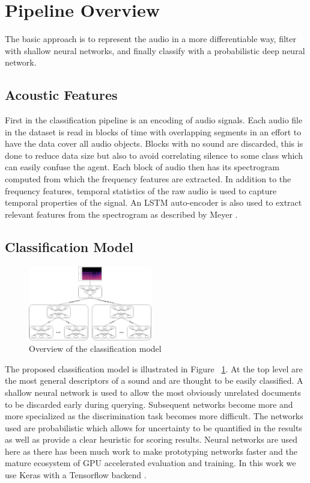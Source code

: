 \section{Pipeline Overview}
The basic approach is to represent the audio in a more differentiable way, filter with shallow neural networks, and finally classify with a probabilistic deep neural network.

\subsection{Acoustic Features}
First in the classification pipeline is an encoding of audio signals. Each audio file in the dataset is read in blocks of time with overlapping segments in an effort to have the data cover all audio objects. Blocks with no sound are discarded, this is done to reduce data size but also to avoid correlating silence to some class which can easily confuse the agent. Each block of audio then has its spectrogram computed from which the frequency features are extracted. In addition to the frequency features, temporal statistics of the raw audio is used to capture temporal properties of the signal. An LSTM auto-encoder is also used to extract relevant features from the spectrogram as described by Meyer \cite{Meyer2017}.

\subsection{Classification Model}

\begin{figure}[h!]
    \centering
    \includegraphics[width=0.48\textwidth]{figures/NeuralNetHierarchy.png}
    \caption{Overview of the classification model}
    \label{fig:NetHier}
\end{figure}

The proposed classification model is illustrated in Figure ~\ref{fig:NetHier}. At the top level are the most general descriptors of a sound and are thought to be easily classified. A shallow neural network is used to allow the most obviously unrelated documents to be discarded early during querying. Subsequent networks become more and more specialized as the discrimination task becomes more difficult. The networks used are probabilistic which allows for uncertainty to be quantified in the results as well as provide a clear heuristic for scoring results. Neural networks are used here as there has been much work to make prototyping networks faster and the mature ecosystem of GPU accelerated evaluation and training. In this work we use Keras with a Tensorflow backend \cite{Abadi2016, chollet2015keras}.

